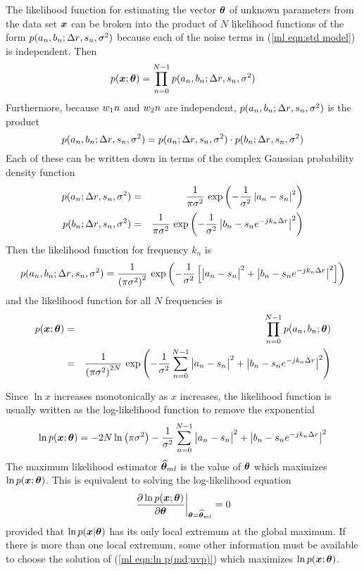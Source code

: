 The likelihood function for estimating the vector $\bm{\theta}$ of unknown
parameters from the data set $\bm{x}$ can be broken into the product of
$N$ likelihood functions of the form $p(a_n,b_n;{\Delta r},s_n,{\sigma^2})$ because each 
of the noise terms in (\ref{ml eqn:std model}) is independent.  Then
\begin{equation}
p(\bm{x};\bm{\theta})=\prod_{n=0}^{N-1}p(a_n,b_n;{\Delta r},s_n,{\sigma^2})
\end{equation}
Furthermore, because ${w_1}{n}$ and ${w_2}{n}$ are independent,
$p(a_n,b_n;{\Delta r},s_n,{\sigma^2})$ is the product
\begin{equation}
p(a_n,b_n;{\Delta r},s_n,{\sigma^2})=p(a_n;{\Delta r},s_n,{\sigma^2})\cdot p(b_n;{\Delta r},s_n,{\sigma^2})
\end{equation}
Each of these can be written down in terms of the complex Gaussian
probability density function
\begin{eqnarray}
p(a_n;{\Delta r},s_n,{\sigma^2})&=&\frac{1}{\pi{\sigma^2}}\,
\exp\left(-\frac{1}{{\sigma^2}}\left|a_n-s_n\right|^2\right) \\
p(b_n;{\Delta r},s_n,{\sigma^2})&=&\frac{1}{\pi{\sigma^2}}\,
\exp\left(-\frac{1}{{\sigma^2}}\left|b_n-s_n{e^{-jk_n{\Delta r}}}\right|^2\right)
\end{eqnarray}
Then the likelihood function for frequency $k_n$ is
\begin{equation}
p(a_n,b_n;\dr,s_n,\nv)=\frac{1}{\left(\pi\nv{}\right)^2}\,\exp\left(
-\frac{1}{\nv}\left[
\left|\vphantom{\e{k}}a_n-s_n\right|^2+\left|b_n-s_n\e{-jk_n\dr}\right|^2
\right]\right)
\end{equation}
and the likelihood function for all $N$ frequencies is
\begin{eqnarray}
p(\md;\uvp)&=&\prod_{n=0}^{N-1} p(a_n,b_n;\uvp)\nn\\
&=&\frac{1}{\left(\pi\nv\right)^{2N}}\,\exp\left(
-\frac{1}{\nv}\sum_{n=0}^{N-1}
\left|\vphantom{\e{k}}a_n-s_n\right|^2+\left|b_n-s_n\e{-jk_n\dr}\right|^2
\right)
\label{ml eqn:p(md;uvp)}
\end{eqnarray}

Since $\ln x$ increases monotonically as $x$ increases, the likelihood 
function is usually written as the log-likelihood function to
remove the exponential
\begin{equation}\label{ml eqn:ln p(md;uvp)}
\ln p(\md;\uvp)=-2N\ln\left(\pi\nv\right)-\frac{1}{\nv}\sum_{n=0}^{N-1}
\left|\vphantom{\e{k}}a_n-s_n\right|^2+\left|b_n-s_n\e{-jk_n\dr}\right|^2
\end{equation}
The maximum likelihood estimator $\widehat{\bm{\theta}}_{ml}$ is the value of $\bm{\theta}$ which
maximizes $\ln p(\bm{x};\bm{\theta})$.  This is equivalent to solving the log-likelihood
equation 
\begin{equation}
\left.\frac{{\partial}\ln p(\bm{x};\bm{\theta})}{{\partial}\bm{\theta}}\right|_{\bm{\theta}=\widehat{\bm{\theta}}_{ml}}=0
\end{equation}
provided that $\ln p(\bm{x}|\bm{\theta})$ has its only local extremum at the global
maximum.  If there is more than one local extremum, some other information
must be available to choose the solution of (\ref{ml eqn:ln p(md;uvp)})
which maximizes $\ln p(\bm{x};\bm{\theta})$.

